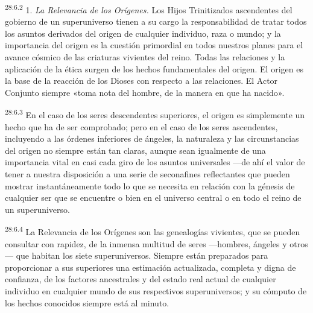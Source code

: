 \par
\textsuperscript{28:6.2} 1. \textit{La Relevancia de los Orígenes.} Los Hijos Trinitizados ascendentes del gobierno de un superuniverso tienen a su cargo la responsabilidad de tratar todos los asuntos derivados del origen de cualquier individuo, raza o mundo; y la importancia del origen es la cuestión primordial en todos nuestros planes para el avance cósmico de las criaturas vivientes del reino. Todas las relaciones y la aplicación de la ética surgen de los hechos fundamentales del origen. El origen es la base de la reacción de los Dioses con respecto a las relaciones. El Actor Conjunto siempre «toma nota del hombre, de la manera en que ha nacido».

\par
\textsuperscript{28:6.3} En el caso de los seres descendentes superiores, el origen es simplemente un hecho que ha de ser comprobado; pero en el caso de los seres ascendentes, incluyendo a las órdenes inferiores de ángeles, la naturaleza y las circunstancias del origen no siempre están tan claras, aunque sean igualmente de una importancia vital en casi cada giro de los asuntos universales ---de ahí el valor de tener a nuestra disposición a una serie de seconafines reflectantes que pueden mostrar instantáneamente todo lo que se necesita en relación con la génesis de cualquier ser que se encuentre o bien en el universo central o en todo el reino de un superuniverso.

\par
\textsuperscript{28:6.4} La Relevancia de los Orígenes son las genealogías vivientes, que se pueden consultar con rapidez, de la inmensa multitud de seres ---hombres, ángeles y otros--- que habitan los siete superuniversos. Siempre están preparados para proporcionar a sus superiores una estimación actualizada, completa y digna de confianza, de los factores ancestrales y del estado real actual de cualquier individuo en cualquier mundo de sus respectivos superuniversos; y su cómputo de los hechos conocidos siempre está al minuto.

